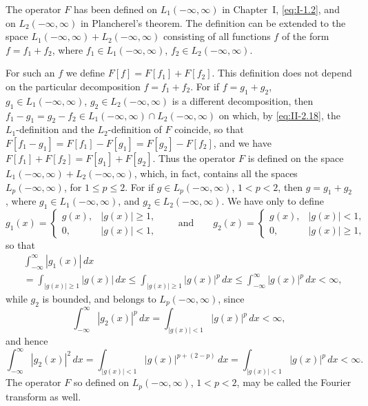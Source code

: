\begin{remark}
The operator $F$ has been defined on $L_{1}(-\infty,\infty)$ in Chapter~I, \eqref{eq:I-1.2}, and on $L_{2}(-\infty,\infty)$ in Plancherel's theorem. The definition can be extended to the space $L_{1}(-\infty,\infty)+L_{2}(-\infty,\infty)$ consisting of all functions $f$ of the form $f=f_{1}+f_{2}$, where $f_{1}\in L_{1}(-\infty,\infty)$, $f_{2}\in L_{2}(-\infty,\infty)$.

For such an $f$ we define $F[f]=F[f_{1}]+F[f_{2}]$. This definition does not depend on the particular decomposition $f=f_{1}+f_{2}$. For if $f=g_{1}+g_{2}$, $g_{1}\in L_{1}(-\infty,\infty)$, $g_{2}\in L_{2}(-\infty,\infty)$ is a different decomposition, then $f_{1}-g_{1}=g_{2}-f_{2}\in L_{1}(-\infty,\infty)\cap L_{2}(-\infty,\infty)$ on which, by \eqref{eq:II-2.18}, the $L_{1}$-definition and the $L_{2}$-definition of $F$ coincide, so that $F[f_{1}-g_{1}]=F[f_{1}]-F[g_{1}]=F[g_{2}]-F[f_{2}]$, and we have $F[f_{1}]+F[f_{2}]=F[g_{1}]+F[g_{2}]$. Thus the operator $F$ is defined on the space $L_{1}(-\infty,\infty)+L_{2}(-\infty,\infty)$, which, in fact, contains all the spaces $L_{p}(-\infty,\infty)$, for $1\le p\le 2$. For if $g\in L_{p}(-\infty,\infty)$, $1<p<2$, then $g=g_{1}+g_{2}$, where $g_{1}\in L_{1}(-\infty,\infty)$, and $g_{2}\in L_{2}(-\infty,\infty)$. We have only to define
\[
g_{1}(x)=
\begin{cases}
g(x), & |g(x)|\ge 1,\\
0, & |g(x)|<1,
\end{cases}
\qquad\text{and}\qquad
g_{2}(x)=
\begin{cases}
g(x), & |g(x)|<1,\\
0, & |g(x)|\ge 1,
\end{cases}
\]
so that
\[
\begin{aligned}
&\int_{-\infty}^{\infty}|g_{1}(x)|\,dx\\
&= \int_{|g(x)|\ge 1}|g(x)|\,dx \le \int_{|g(x)|\ge 1}|g(x)|^{p}\,dx \le \int_{-\infty}^{\infty}|g(x)|^{p}\,dx < \infty,
\end{aligned}
\]
while $g_{2}$ is bounded, and belongs to $L_{p}(-\infty,\infty)$, since
\[
\int_{-\infty}^{\infty}|g_{2}(x)|^{p}\,dx
=\int_{|g(x)|<1}|g(x)|^{p}\,dx<\infty,
\]
and hence
\[
\int_{-\infty}^{\infty}|g_{2}(x)|^{2}\,dx
=\int_{|g(x)|<1}|g(x)|^{p+(2-p)}\,dx
=\int_{|g(x)|<1}|g(x)|^{p}\,dx<\infty.
\]
The operator $F$ so defined on $L_{p}(-\infty,\infty)$, $1<p<2$, may be called the Fourier transform as well.
\end{remark}

